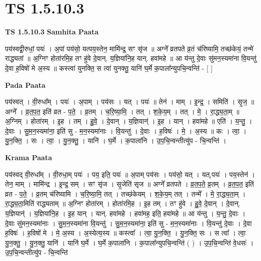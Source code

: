 \documentclass[17pt]{extarticle}
\begin{document}
\section{ TS 1.5.10.3 }

\textbf{TS 1.5.10.3 } \newline
\textbf{Samhita Paata} \newline

पय॑स्वद्वी॒रुधां॒ पयः॑ । अ॒पां पय॑सो॒ यत्पय॒स्तेन॒ मामि॑न्द्र॒ सꣳ सृ॑ज ॥ अग्ने᳚ व्रतपते व्र॒तं च॑रिष्यामि॒ तच्छ॑केयं॒ तन्मे॑ राद्ध्यतां ॥ अ॒ग्निꣳ होता॑रमि॒ह तꣳ हु॑वे दे॒वान्. य॒ज्ञिया॑नि॒ह यान्. हवा॑महे ॥ आ य॑न्तु दे॒वाः सु॑मन॒स्यमा॑ना वि॒यन्तु॑ दे॒वा ह॒विषो॑ मे अ॒स्य ॥ कस्त्वा॑ युनक्ति॒ स त्वा॑ युनक्तु॒ यानि॑ घ॒र्मे क॒पाला᳚न्युपचि॒न्वन्ति॑ - [ ] \newline

\textbf{Pada Paata} \newline

पय॑स्वत् । वी॒रुधा᳚म् । पयः॑ । अ॒पाम् । पय॑सः । यत् । पयः॑ ॥ तेन॑ । माम् । इ॒न्द्र॒ । समिति॑ । सृ॒ज॒ ॥ अग्ने᳚ । व्र॒त॒प॒त॒ इति॑ व्रत - प॒ते॒ । व्र॒तम् । च॒रि॒ष्या॒मि॒ । तत् । श॒के॒य॒म् । तत् । मे॒ । रा॒द्ध्य॒ता॒म् ॥ अ॒ग्निम् । होता॑रम् । इ॒ह । तम् । हु॒वे॒ । दे॒वान् । य॒ज्ञियान्॑ । इ॒ह । यान् । हवा॑महे ॥ एति॑ । य॒न्तु॒ । दे॒वाः । सु॒म॒न॒स्यमा॑ना॒ इति॑ सु - म॒न॒स्यमा॑नाः । वि॒यन्तु॑ । दे॒वाः । ह॒विषः॑ । मे॒ । अ॒स्य ॥ कः । त्वा॒ । यु॒न॒क्ति॒ । सः । त्वा॒ । यु॒न॒क्तु॒ । यानि॑ । घ॒र्मे । क॒पाला॑नि । उ॒प॒चि॒न्वन्तीत्यु॑प - चि॒न्वन्ति॑ ।  \newline


\textbf{Krama Paata} \newline

पय॑स्वद् वी॒रुधा᳚म् । वी॒रुधा॒म् पयः॑ । पय॒ इति॒ पयः॑ ॥ अ॒पाम् पय॑सः । पय॑सो॒ यत् । यत्,पयः॑ । पय॒स्तेन॑ । तेन॒ माम् । मामि॑न्द्र । इ॒न्द्र॒ सम् । सꣳ सृ॑ज । सृ॒जेति॑ सृज ॥ अग्ने᳚ व्रतपते । व्र॒त॒प॒ते॒ व्र॒तम् । व्र॒त॒प॒त॒ इति॑ व्रत - प॒ते॒ । व्र॒तम् च॑रिष्यामि । च॒रि॒ष्या॒मि॒ तत् । तच्छ॑केयम् । श॒के॒य॒म् तत् । तन्मे᳚ । मे॒ रा॒द्ध्य॒ता॒म् । रा॒द्ध्य॒ता॒मिति॑ राद्ध्यताम् ॥ अ॒ग्निꣳ होता॑रम् । होता॑रमि॒ह । इ॒ह तम् । तꣳ हु॑वे । हु॒वे॒ दे॒वान् । दे॒वान्. य॒ज्ञियान्॑ । य॒ज्ञिया॑नि॒ह । इ॒ह यान् । यान्. हवा॑महे । हवा॑मह॒ इति॒ हवा॑महे ॥ आ य॑न्तु । य॒न्तु॒ दे॒वाः । दे॒वाः सु॑मन॒स्यमा॑नाः । सु॒म॒न॒स्यमा॑ना वि॒यन्तु॑ । सु॒म॒न॒स्यमा॑ना॒ इति॑ सु - म॒न॒स्यमा॑नाः । वि॒यन्तु॑ दे॒वाः । दे॒वा ह॒विषः॑ । ह॒विषो॑ मे । मे॒ अ॒स्य । अ॒स्येत्य॒स्य ॥ कस्त्वा᳚ । त्वा॒ यु॒न॒क्ति॒ । यु॒न॒क्ति॒ सः । स त्वा᳚ । त्वा॒ यु॒न॒क्तु॒ । यु॒न॒क्तु॒ यानि॑ । यानि॑ घ॒र्मे । घ॒र्मे क॒पाला॑नि । क॒पाला᳚न्युपचि॒न्वन्ति॑ ( ) । उ॒प॒चि॒न्वन्ति॑ वे॒धसः॑ । उ॒प॒चि॒न्वन्तीत्यु॑प - चि॒न्वन्ति॑ \newline
\end{document}
